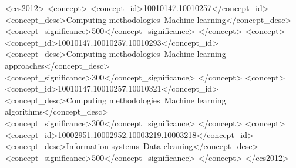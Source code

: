 \documentclass[manuscript,screen]{acmart}
\begin{document}
\begin{CCSXML}
	<ccs2012>
	   <concept>
		   <concept_id>10010147.10010257</concept_id>
		   <concept_desc>Computing methodologies~Machine learning</concept_desc>
		   <concept_significance>500</concept_significance>
		   </concept>
	   <concept>
		   <concept_id>10010147.10010257.10010293</concept_id>
		   <concept_desc>Computing methodologies~Machine learning approaches</concept_desc>
		   <concept_significance>300</concept_significance>
		   </concept>
	   <concept>
		   <concept_id>10010147.10010257.10010321</concept_id>
		   <concept_desc>Computing methodologies~Machine learning algorithms</concept_desc>
		   <concept_significance>300</concept_significance>
		   </concept>
	   <concept>
		   <concept_id>10002951.10002952.10003219.10003218</concept_id>
		   <concept_desc>Information systems~Data cleaning</concept_desc>
		   <concept_significance>500</concept_significance>
		   </concept>
	 </ccs2012>
\end{CCSXML}




\maketitle










	
\clearpage

%
\normalem


\end{document}
